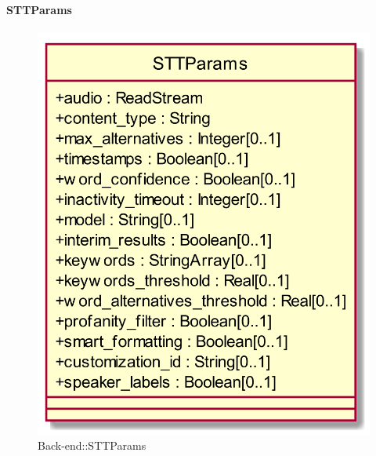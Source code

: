 \hypertarget{STTParams_label}{\paragraph{STTParams}}
\begin{figure}[h]
	\centering
	\includegraphics[width=\textwidth,height=\textheight,keepaspectratio]{images/ClassSTTParams.png}
	\caption{Back-end::STTParams}
\end{figure}
